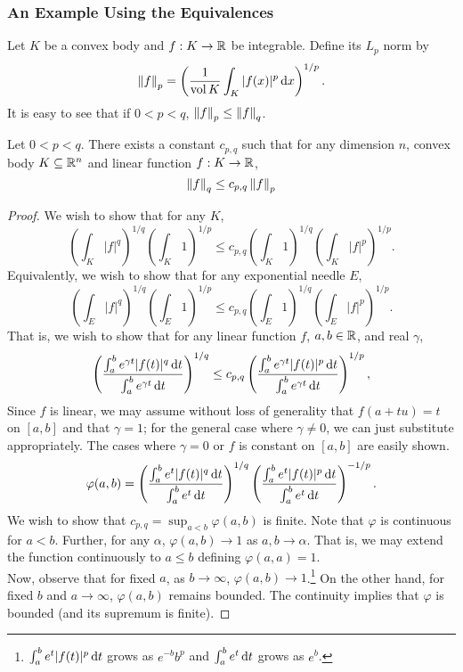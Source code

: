 \subsubsection{An Example Using the Equivalences}

Let $K$ be a convex body and $f:K\to\mathbb{R}$ be integrable. Define its $L_p$ norm by
\[ \left\lVert f\right\rVert_p = \left(\frac{1}{\operatorname{vol} K} \int_{K} |f(x)|^p \operatorname{d}\!{x} \right)^{1/p}. \]
It is easy to see that if $0<p<q$, $\left\lVert f\right\rVert_p \leq \left\lVert f\right\rVert_q$.
\begin{theorem}
	Let $0<p<q$. There exists a constant $c_{p,q}$ such that for any dimension $n$, convex body $K\subseteq\mathbb{R}^n$ and linear function $f:K\to\mathbb{R}$,
	\[ \left\lVert f\right\rVert_q \leq c_{p,q}\left\lVert f\right\rVert_p \]
\end{theorem}
\begin{proof}
	We wish to show that for any $K$,
	\[ \left(\int_K |f|^q\right)^{1/q} \left(\int_K 1\right)^{1/p} \leq c_{p,q} \left(\int_K 1\right)^{1/q} \left(\int_K |f|^p\right)^{1/p}. \]
	Equivalently, we wish to show that for any exponential needle $E$,
	\[ \left(\int_E |f|^q\right)^{1/q} \left(\int_E 1\right)^{1/p} \leq c_{p,q} \left(\int_E 1\right)^{1/q} \left(\int_E |f|^p\right)^{1/p}. \]
	That is, we wish to show that for any linear function $f$, $a,b\in\mathbb{R}$, and real $\gamma$,
	\[ \left( \frac{\int_a^b e^{\gamma t} |f(t)|^q\operatorname{d}\!{t}}{\int_a^b e^{\gamma t}\operatorname{d}\!{t}} \right)^{1/q} \leq c_{p,q} \left( \frac{\int_a^b e^{\gamma t} |f(t)|^p\operatorname{d}\!{t}}{\int_a^b e^{\gamma t}\operatorname{d}\!{t}}\right)^{1/p}, \]
	Since $f$ is linear, we may assume without loss of generality that $f(a+tu)=t$ on $[a,b]$ and that $\gamma=1$; for the general case where $\gamma\neq 0$, we can just substitute appropriately. The cases where $\gamma=0$ or $f$ is constant on $[a,b]$ are easily shown.\\
	\[ \varphi(a,b) = \left( \frac{\int_a^b e^{t} |f(t)|^q\operatorname{d}\!{t}}{\int_a^b e^{t}\operatorname{d}\!{t}} \right)^{1/q} \left( \frac{\int_a^b e^{t} |f(t)|^p\operatorname{d}\!{t}}{\int_a^b e^{t}\operatorname{d}\!{t}} \right)^{-1/p}. \]
	We wish to show that $c_{p,q} = \sup_{a<b} \varphi(a,b)$ is finite. Note that $\varphi$ is continuous for $a<b$. Further, for any $\alpha$, $\varphi(a,b)\to 1$ as $a,b\to\alpha$. That is, we may extend the function continuously to $a\leq b$ defining $\varphi(a,a)=1$.\\
	Now, observe that for fixed $a$, as $b\to\infty$, $\varphi(a,b)\to 1$.\footnote{$\int_a^b e^t |f(t)|^p\operatorname{d}\!{t}$ grows as $e^{-b}b^p$ and $\int_a^b e^t\operatorname{d}\!{t}$ grows as $e^b$.} On the other hand, for fixed $b$ and $a\to\infty$, $\varphi(a,b)$ remains bounded. The continuity implies that $\varphi$ is bounded (and its supremum is finite).
\end{proof}

